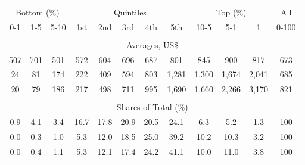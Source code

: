 \begin{tabular}{c c c| c c c c c| c c c| c}
\toprule
\multicolumn{3}{c|}{Bottom (\%)} & \multicolumn{5}{c|}{Quintiles} & \multicolumn{3}{c|}{Top (\%)} & All  \\
0-1 & 1-5 & 5-10 &  1st & 2nd & 3rd & 4th & 5th & 10-5 & 5-1 & 1 & 0-100 \\
\midrule \\
\multicolumn{12}{c}{Averages, US\$} \\
\midrule
507  & 701  & 501  & 572  & 604  & 696  & 687  & 801  & 845  & 900  & 817  & 673 \\
24 & 81 & 174 & 222 & 409 & 594 & 803 & 1,281 & 1,300 & 1,674 & 2,041 & 685 \\
20 & 79 & 186 & 217 & 498 & 711 & 995 & 1,690 & 1,660 & 2,266 & 3,170 & 821 \\
\midrule \\
\multicolumn{12}{c}{Shares of Total (\%)} \\
\midrule
0.9   & 4.1   & 3.4   & 16.7   & 17.8   & 20.9   & 20.5   & 24.1   & 6.3   & 5.2   & 1.3   & 100 \\
0.0  & 0.3  & 1.0  & 5.3  & 12.0  & 18.5  & 25.0  & 39.2  & 10.2  & 10.3  & 3.2  & 100 \\
0.0  & 0.4  & 1.1  & 5.3  & 12.1  & 17.4  & 24.2  & 41.1  & 10.0  & 11.0  & 3.8  & 100 \\
\bottomrule
\end{tabular}